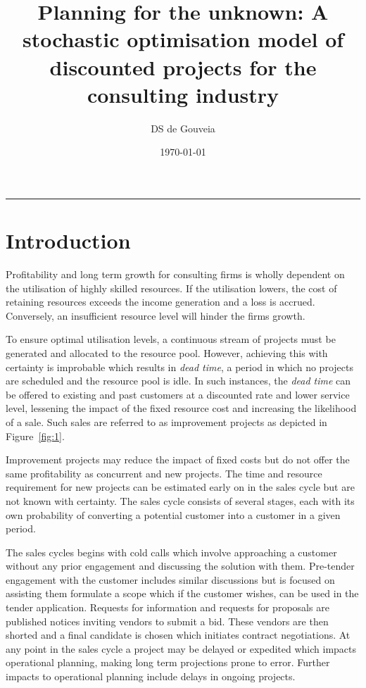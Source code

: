 \documentclass[a4paper,11pt]{article}
\title{Planning for the unknown: A stochastic optimisation model of discounted projects for the consulting industry}
\author{DS de Gouveia}
\date{\today}
\begin{document}
\maketitle
\tableofcontents

\vspace*{5mm} \hrule


\section{Introduction}
Profitability and long term growth for consulting firms is wholly dependent on the utilisation of highly skilled resources. If the utilisation lowers, the cost of retaining resources exceeds the income generation and a loss is accrued. Conversely, an insufficient resource level will hinder the firms growth. 

To ensure optimal utilisation levels, a continuous stream of projects must be generated and allocated to the resource pool. However, achieving this with certainty is improbable which results in \textit{dead time}, a period in which no projects are scheduled and the resource pool is idle. In such instances, the \textit{dead time} can be offered to existing and past customers at a discounted rate and lower service level, lessening the impact of the fixed resource cost and increasing the likelihood of a sale. Such sales are referred to as improvement projects as depicted in Figure~\ref{fig:1}.

Improvement projects may reduce the impact of fixed costs but do not offer the same profitability as concurrent and new projects. The time and resource requirement for new projects can be estimated early on in the sales cycle but are not known with certainty. The sales cycle consists of several stages, each with its own probability of converting a potential customer into a customer in a given period. 

The sales cycles begins with cold calls which involve approaching a customer without any prior engagement and discussing the solution with them. Pre-tender engagement with the customer includes similar discussions but is focused on assisting them formulate a scope which if the customer wishes, can be used in the tender application. Requests for information and requests for proposals are published notices inviting vendors to submit a bid. These vendors are then shorted and a final candidate is chosen which initiates contract negotiations. At any point in the sales cycle a project may be delayed or expedited which impacts operational planning, making long term projections prone to error. Further impacts to operational planning include delays in ongoing projects.
\end{document}
